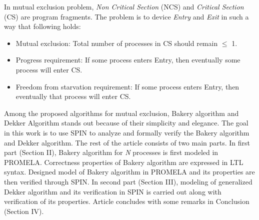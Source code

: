 \documentclass[conference]{IEEEtran}
\begin{document}
In mutual exclusion problem, \textit{Non Critical Section} (NCS) and \textit{Critical Section} (CS) are program fragments. 
The problem is to device \textit{Entry} and \textit{Exit} in such a way that following holds: 
\begin{itemize}
 \item Mutual exclusion: Total number of processes in CS should remain $\leq$ 1.
 \item Progress requirement: If some process enters Entry, then eventually some process will enter CS. 
 \item Freedom from starvation requirement: If some process enters Entry, then eventually that process will enter CS. 
\end{itemize}

Among the proposed algorithms for mutual exclusion, Bakery algorithm \cite{13} and Dekker Algorithm \cite{9} stands out because of their simplicity
and elegance. 
The goal in this work is to use SPIN to analyze and formally verify the Bakery algorithm and Dekker algorithm. The rest of the article 
consists of two main parts. In first part (Section II), Bakery algorithm for \emph{N} processes is first modeled in PROMELA. Correctness properties 
of Bakery algorithm are expressed in LTL syntax. Designed model of Bakery algorithm in PROMELA and its properties are then verified through SPIN.
In second part (Section III), modeling of generalized Dekker algorithm and its verification in SPIN is carried out along with verification of 
its properties. Article concludes with some remarks in Conclusion (Section IV).
\end{document}
